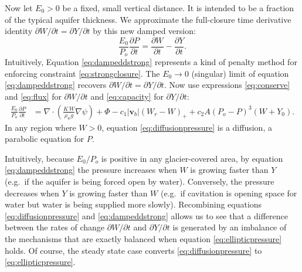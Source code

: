 \documentclass[11pt,final]{amsart}%
\newcommand\bv{\mathbf{v}}
\newcommand{\Div}{\nabla\cdot}
\newcommand{\grad}{\nabla}
\begin{document}
Now let $E_0>0$ be a fixed, small vertical distance.  It is intended to be a fraction of the typical aquifer thickness.  We approximate the full-closure time derivative identity $\partial W/\partial t = \partial Y/\partial t$ by this new damped version:
\begin{equation}
\frac{E_0}{P_o} \frac{\partial P}{\partial t} =  \frac{\partial W}{\partial t}  - \frac{\partial Y}{\partial t}.\label{eq:dampeddstrong}
\end{equation}
Intuitively, Equation \eqref{eq:dampeddstrong} represents a kind of penalty method \citep{NocedalWright} for enforcing constraint \eqref{eq:strongclosure}.  The $E_0\to 0$ (singular) limit of equation \eqref{eq:dampeddstrong} recovers $\partial W/\partial t = \partial Y/\partial t$.  Now use expressions \eqref{eq:conserve} and \eqref{eq:flux} for $\partial W/\partial t$ and \eqref{eq:capacity} for $\partial Y/\partial t$:
\begin{align}
\frac{E_0}{P_o} \frac{\partial P}{\partial t} &= \Div \left(\frac{K\,W}{\rho_w g} \grad \psi\right) + \Phi - c_1 |\bv_b| (W_r - W)_+  + c_2 A (P_o - P)^3 (W+Y_0). \label{eq:diffusionpressure}
\end{align}
In any region where $W>0$, equation \eqref{eq:diffusionpressure} is a diffusion, a parabolic equation for $P$.

Intuitively, because $E_0/P_o$ is positive in any glacier-covered area, by equation \eqref{eq:dampeddstrong} the pressure increases when $W$ is growing faster than $Y$ (e.g.~if the aquifer is being forced open by water).  Conversely, the pressure decreases when $Y$ is growing faster than $W$ (e.g.~if cavitation is opening space for water but water is being supplied more slowly).  Recombining equations \eqref{eq:diffusionpressure} and \eqref{eq:dampeddstrong} allows us to see that a difference between the rates of change $\partial W/\partial t$ and $\partial Y/\partial t$ is generated by an imbalance of the mechanisms that are exactly balanced when equation \eqref{eq:ellipticpressure} holds.  Of course, the steady state case converts \eqref{eq:diffusionpressure} to \eqref{eq:ellipticpressure}.
\end{document}
